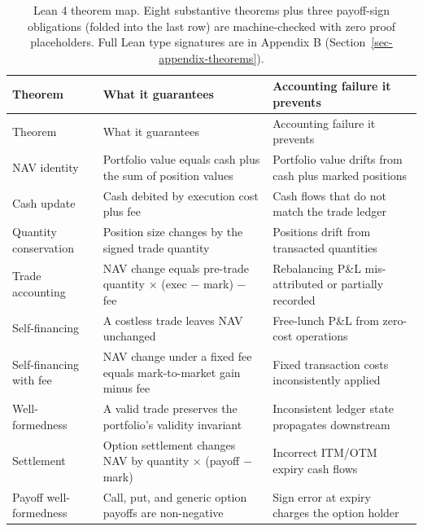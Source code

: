 \documentclass[
  11pt,
  letterpaper,
  DIV=12,
  numbers=noendperiod]{scrartcl}
\numberwithin{equation}{section}
\numberwithin{figure}{section}
\numberwithin{table}{section}
\begin{document}
\begin{longtable}[]{@{}
  >{\raggedright\arraybackslash}p{}
  >{\raggedright\arraybackslash}p{}
  >{\raggedright\arraybackslash}p{}@{}}
\caption{Lean 4 theorem map. Eight substantive theorems plus three
payoff-sign obligations (folded into the last row) are machine-checked
with zero proof placeholders. Full Lean type signatures are in Appendix
B (Section~\ref{sec-appendix-theorems}).
}\label{tbl-theorems}\tabularnewline
\toprule\noalign{}
\begin{minipage}[b]{\linewidth}\raggedright
Theorem
\end{minipage} & \begin{minipage}[b]{\linewidth}\raggedright
What it guarantees
\end{minipage} & \begin{minipage}[b]{\linewidth}\raggedright
Accounting failure it prevents
\end{minipage} \\
\midrule\noalign{}
\endfirsthead
\toprule\noalign{}
\begin{minipage}[b]{\linewidth}\raggedright
Theorem
\end{minipage} & \begin{minipage}[b]{\linewidth}\raggedright
What it guarantees
\end{minipage} & \begin{minipage}[b]{\linewidth}\raggedright
Accounting failure it prevents
\end{minipage} \\
\midrule\noalign{}
\endhead
\bottomrule\noalign{}
\endlastfoot
NAV identity & Portfolio value equals cash plus the sum of position
values & Portfolio value drifts from cash plus marked positions \\
Cash update & Cash debited by execution cost plus fee & Cash flows that
do not match the trade ledger \\
Quantity conservation & Position size changes by the signed trade
quantity & Positions drift from transacted quantities \\
Trade accounting & NAV change equals pre-trade quantity × (exec − mark)
− fee & Rebalancing P\&L mis-attributed or partially recorded \\
Self-financing & A costless trade leaves NAV unchanged & Free-lunch P\&L
from zero-cost operations \\
Self-financing with fee & NAV change under a fixed fee equals
mark-to-market gain minus fee & Fixed transaction costs inconsistently
applied \\
Well-formedness & A valid trade preserves the portfolio's validity
invariant & Inconsistent ledger state propagates downstream \\
Settlement & Option settlement changes NAV by quantity × (payoff − mark)
& Incorrect ITM/OTM expiry cash flows \\
Payoff well-formedness & Call, put, and generic option payoffs are
non-negative & Sign error at expiry charges the option holder \\
\end{longtable}
\end{document}
